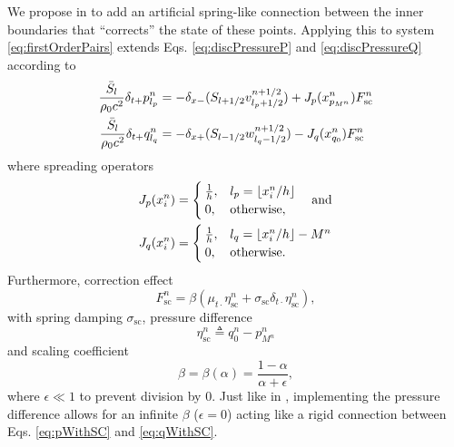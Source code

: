 We propose in \cite{Willemsen2021} to add an artificial spring-like connection between the inner boundaries that ``corrects'' the state of these points. Applying this to system \eqref{eq:firstOrderPairs} extends Eqs. \eqref{eq:discPressureP} and \eqref{eq:discPressureQ} according to
\begin{subequations}\label{eq:pressuresWithSC}
    \begin{align}
        \frac{\bar S_{l}}{\rho_0 c^2}\delta_{t+}p_{l_p}^n &= -\delta_{x-}(S_{{l}+1/2}v_{{l_p}+1/2}^{n+1/2}) + J_p(x_{p_{M^n}}^n)F_\text{sc}^n\label{eq:pWithSC}\\
        \frac{\bar S_{l}}{\rho_0 c^2}\delta_{t+}q_{l_q}^n &= -\delta_{x+}(S_{{l}-1/2}w_{{l_q}-1/2}^{n+1/2}) - J_q(x_{q_0}^n)F_\text{sc}^n\label{eq:qWithSC}
    \end{align}
\end{subequations}
where spreading operators
\begin{equation}\label{eq:spreadingOperators}
    \begin{aligned}
    J_p(x_i^n)& =
    \begin{cases}
        \frac{1}{h}, & {l_p} = \lfloor x_i^n/h\rfloor\\
        0,& \text{otherwise},
    \end{cases}
    \quad\text{and}\\
    J_q(x_i^n) &=
    \begin{cases}
        \frac{1}{h}, & {l_q} = \lfloor x_i^n/h \rfloor - M^n\\
        0,& \text{otherwise}.
    \end{cases}
\end{aligned}
\end{equation}
Furthermore, correction effect
\begin{equation}\label{eq:scForce}
    F_\text{sc}^n = \beta\left(\mu_{t\cdot}\eta_\text{sc}^n+\sigma_\text{sc}\delta_{t\cdot}\eta_\text{sc}^n\right),
\end{equation}
with spring damping $\sigma_\text{sc}$, pressure difference
\begin{equation}
    \eta_\text{sc}^n \triangleq q_0^n - p_{M^n}^n
\end{equation} 
and scaling coefficient
\begin{equation}\label{eq:betaDef}
    \beta = \beta(\alpha) = \frac{1-\alpha}{\alpha+\epsilon},
\end{equation}
where $\epsilon\ll 1$ to prevent division by 0. Just like in \cite{Willemsen2021}, implementing the pressure difference allows for an infinite $\beta$ ($\epsilon = 0$) acting like a rigid connection between Eqs. \eqref{eq:pWithSC} and \eqref{eq:qWithSC}.
